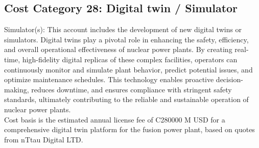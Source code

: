 
\subsection{Cost Category 28: Digital twin / Simulator }

Simulator(s): This account includes the development of new digital twins or simulators.  Digital twins play a pivotal role in enhancing the safety, efficiency, and overall operational effectiveness of nuclear power plants. By creating real-time, high-fidelity digital replicas of these complex facilities, operators can continuously monitor and simulate plant behavior, predict potential issues, and optimize maintenance schedules. This technology enables proactive decision-making, reduces downtime, and ensures compliance with stringent safety standards, ultimately contributing to the reliable and sustainable
operation of nuclear power plants.\\

Cost basis is the estimated annual license fee of C280000 M USD for a comprehensive digital twin platform for the fusion power plant, based on quotes from nTtau Digital LTD.